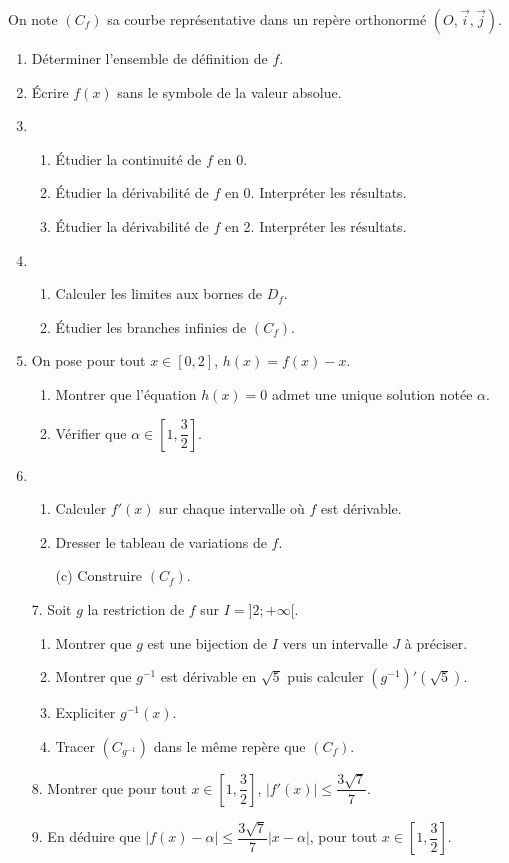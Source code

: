 \documentclass[12pt]{article}
\begin{document}
On note $(C_f)$ sa courbe représentative dans un repère orthonormé $(O, \vec{i}, \vec{j})$.

\begin{enumerate}
    \item Déterminer l’ensemble de définition de $f$.
    \item Écrire $f(x)$ sans le symbole de la valeur absolue.
    \item
    \begin{enumerate}
        \item Étudier la continuité de $f$ en 0.
        \item Étudier la dérivabilité de $f$ en 0. Interpréter les résultats.
        \item Étudier la dérivabilité de $f$ en 2. Interpréter les résultats.
    \end{enumerate}
    \item
    \begin{enumerate}
        \item Calculer les limites aux bornes de $D_f$.
        \item Étudier les branches infinies de $(C_f)$.
    \end{enumerate}
    \item On pose pour tout $x \in [0, 2]$, $h(x) = f(x) - x$.
    \begin{enumerate}
        \item Montrer que l’équation $h(x) = 0$ admet une unique solution notée $\alpha$.
        \item Vérifier que $\alpha \in \left[1, \dfrac{3}{2}\right]$.
    \end{enumerate}
    \item
    \begin{enumerate}
        \item Calculer $f'(x)$ sur chaque intervalle où $f$ est dérivable.
        \item Dresser le tableau de variations de $f$.
        \item[(c)] Construire $(C_f)$.
    \end{enumerate}
    \item[7.] Soit $g$ la restriction de $f$ sur $I = ]2; +\infty[$.
    \begin{enumerate}
        \item Montrer que $g$ est une bijection de $I$ vers un intervalle $J$ à préciser.
        \item Montrer que $g^{-1}$ est dérivable en $\sqrt{5}$ puis calculer $(g^{-1})'(\sqrt{5})$.
        \item Expliciter $g^{-1}(x)$.
        \item Tracer $(C_{g^{-1}})$ dans le même repère que $(C_f)$.
    \end{enumerate}
    \item[8.] Montrer que pour tout $x \in \left[ 1, \dfrac{3}{2} \right]$, $|f'(x)| \leq \dfrac{3\sqrt{7}}{7}$.
    \item[9.] En déduire que $|f(x) - \alpha| \leq \dfrac{3\sqrt{7}}{7} |x - \alpha|$, pour tout $x \in \left[ 1, \dfrac{3}{2} \right]$.
\end{enumerate}
\end{document}
